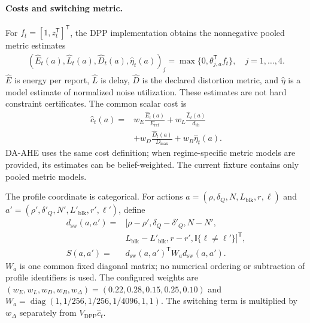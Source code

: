 \paragraph{Costs and switching metric.}
For $f_t=[1,z_t^{\mathsf T}]^{\mathsf T}$, the DPP implementation obtains
the nonnegative pooled metric estimates
\begin{equation}
 \begin{aligned}
 (\widehat{E}_t(a),\widehat{L}_t(a),\widehat{D}_t(a),
            \widehat{\eta}_t(a))_j
  =\max\{0,\theta_{j,a}^{\mathsf T}f_t\},
 \quad j=1,\ldots,4.
 \end{aligned}
 \label{eq:baseline_pooled_metrics}
\end{equation}
$\widehat{E}$ is energy per report, $\widehat{L}$ is delay,
$\widehat{D}$ is the declared distortion metric, and $\widehat{\eta}$ is a
model estimate of normalized noise utilization. These estimates are not hard
constraint certificates. The common scalar cost is
\begin{equation}
 \begin{aligned}
  \widehat{c}_t(a)={}&w_E\frac{\widehat{E}_t(a)}{E_{\mathrm{ref}}}
             +w_L\frac{\widehat{L}_t(a)}{d_{\mathrm{th}}}\\
             &+w_D\frac{\widehat{D}_t(a)}{D_{\max}}
             +w_B\widehat{\eta}_t(a).
 \end{aligned}
 \label{eq:causal_cost}
\end{equation}
DA-AHE uses the same cost definition; when regime-specific metric models are
provided, its estimates can be belief-weighted. The current fixture contains
only pooled metric models.

The profile coordinate is categorical. For actions
$a=(\rho,\delta_Q,N,L_{\mathrm{blk}},r,\ell)$ and
$a'=(\rho',\delta'_Q,N',L'_{\mathrm{blk}},r',\ell')$, define
\begin{equation}
 \begin{aligned}
 d_{\mathrm{sw}}(a,a')={}&[\rho-\rho',\delta_Q-\delta'_Q,N-N',\\
             &L_{\mathrm{blk}}-L'_{\mathrm{blk}},r-r',
                   \mathbb{I}\{\ell\neq\ell'\}]^{\mathsf T},\\
 S(a,a')={}&d_{\mathrm{sw}}(a,a')^{\mathsf T}
                       W_a d_{\mathrm{sw}}(a,a').
 \end{aligned}
 \label{eq:baseline_switching_cost}
\end{equation}
$W_a$ is one common fixed diagonal matrix; no numerical ordering or subtraction
of profile identifiers is used. The configured weights are
$(w_E,w_L,w_D,w_B,w_{\Delta})=(0.22,0.28,0.15,0.25,0.10)$ and
$W_a=\operatorname{diag}(1,1/256,1/256,1/4096,1,1)$.
The switching term is multiplied by $w_{\Delta}$ separately from
$V_{\mathrm{DPP}}\widehat{c}_t$.

